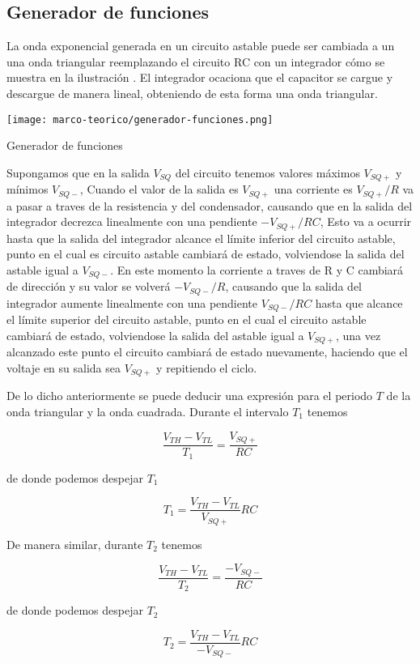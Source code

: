 \subsection{Generador de funciones}

La onda exponencial generada en un circuito astable puede ser cambiada a un una onda triangular reemplazando el circuito RC con un integrador cómo se muestra en la ilustración . El integrador ocaciona que el capacitor se cargue y descargue de manera lineal, obteniendo de esta forma una onda triangular. \cite[pag. ~1366]{sedra-smith}

\begin{ilustracion}[ht]
    \centering
    \texttt{[image: marco-teorico/generador-funciones.png]}
    \caption{Generador de funciones}
\end{ilustracion}

Supongamos que en la salida $V_{SQ}$ del circuito tenemos valores máximos $V_{SQ+}$ y mínimos $V_{SQ-}$, Cuando el valor de la salida es $V_{SQ+}$ una corriente es $V_{SQ+}/R$ va a pasar a traves de la resistencia y del condensador, causando que en la salida del integrador decrezca linealmente con una pendiente $-V_{SQ+}/RC$, Esto va a ocurrir hasta que la salida del integrador alcance el límite inferior del circuito astable, punto en el cual es circuito astable cambiará de estado, volviendose la salida del astable igual a $V_{SQ-}$. En este momento la corriente a traves de R y C cambiará de dirección y su valor se volverá $-V_{SQ-}/R$, causando que la salida del integrador aumente linealmente con una pendiente $V_{SQ-}/RC$ hasta que alcance el límite superior del circuito astable, punto en el cual el circuito astable cambiará de estado, volviendose la salida del astable igual a $V_{SQ+}$, una vez alcanzado este punto el circuito cambiará de estado nuevamente, haciendo que el voltaje en su salida sea $V_{SQ+}$ y repitiendo el ciclo.

De lo dicho anteriormente se puede deducir una expresión para el periodo $T$ de la onda triangular y la onda cuadrada. Durante el intervalo $T_1$ tenemos

\begin{equation*}
    \frac{V_{TH} - V_{TL}}{T_1} = \frac{V_{SQ+}}{RC}
\end{equation*}

de donde podemos despejar $T_1$

\begin{equation}
    T_1 = \frac{V_{TH} - V_{TL}}{V_{SQ+}}RC
    \label{eq:t1}
\end{equation}

De manera similar, durante $T_2$ tenemos

\begin{equation*}
    \frac{V_{TH} - V_{TL}}{T_2} = \frac{-V_{SQ-}}{RC}
\end{equation*}

de donde podemos despejar $T_2$

\begin{equation}
    T_2 = \frac{V_{TH} - V_{TL}}{-V_{SQ-}}RC
\end{equation}